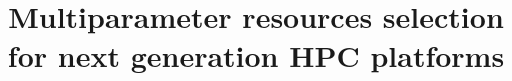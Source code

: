 \documentclass[conference]{IEEEtran}
\begin{document}
%
\title{Multiparameter resources selection for next generation HPC platforms}


\author{
\\
~~~~~~~~~~~~~~~~~~~~~~~~~~~~~~~~~~~~~~~~~
\and
{}
\\
~~~~~~~~~~~~~~~~~~~~~~~~~~~~~~~~~~~~~~~~~~~~

}
\maketitle


\newcommand{\JS}[1]{\textcolor{blue}{[JS: #1]}}
\newcommand{\TI}[1]{\textcolor{red}{[TI: #1]}}
\newcommand{\RS}[1]{\textcolor{cyan}{[RS: #1]}}
\newcommand{\D}[1]{\textcolor{violet}{[DH: #1]}}
\newcommand{\RED}[1]{\textcolor{red}{[ #1]}}
\newcommand{\YG}[1]{\textcolor{orange}{[ #1]}}

\newcommand{\figref}[1]{Figure~\ref{#1}}

\newcommand{\tabref}[1]{Table~\ref{#1}}

\newcommand{\secref}[1]{Section~\ref{#1}}

\newcommand{\todo}[1]{\textbf{\textit{TODO: {#1}}}}

\renewcommand{\bottomfraction}{.5}

\setlength{\itemsep}{-2pt}
\end{document}

